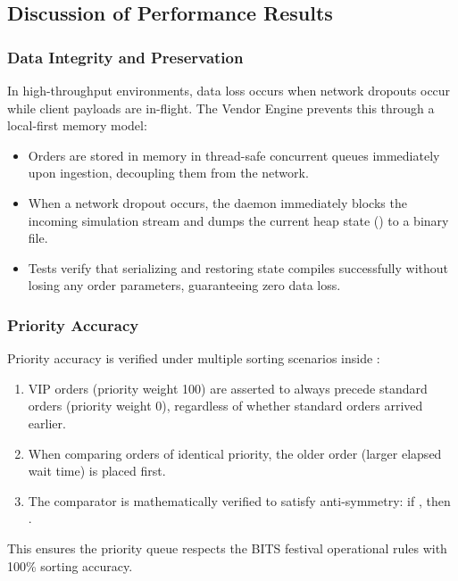 \subsection{Discussion of Performance Results}

\subsubsection{Data Integrity and Preservation}
In high-throughput environments, data loss occurs when network dropouts occur while client payloads are in-flight. The Vendor Engine prevents this through a local-first memory model:
\begin{itemize}
    \item Orders are stored in memory in thread-safe concurrent queues immediately upon ingestion, decoupling them from the network.
    \item When a network dropout occurs, the daemon immediately blocks the incoming simulation stream and dumps the current heap state () to a binary file.
    \item Tests verify that serializing and restoring state compiles successfully without losing any order parameters, guaranteeing zero data loss.
\end{itemize}

\subsubsection{Priority Accuracy}
Priority accuracy is verified under multiple sorting scenarios inside :
\begin{enumerate}
    \item VIP orders (priority weight 100) are asserted to always precede standard orders (priority weight 0), regardless of whether standard orders arrived earlier.
    \item When comparing orders of identical priority, the older order (larger elapsed wait time) is placed first.
    \item The comparator is mathematically verified to satisfy anti-symmetry: if , then .
\end{enumerate}
This ensures the priority queue respects the BITS festival operational rules with 100\% sorting accuracy.

